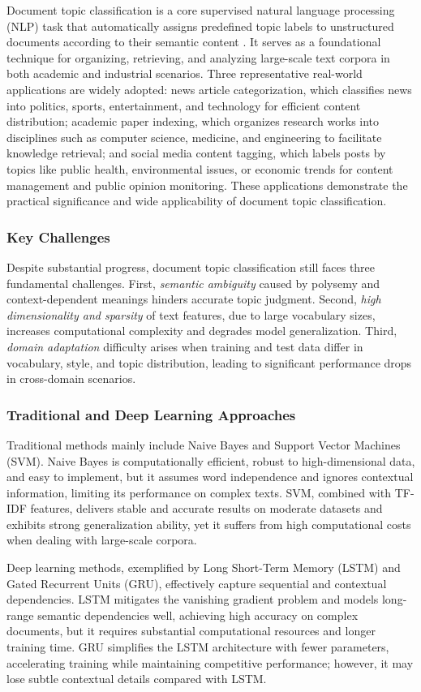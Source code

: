 Document topic classification is a core supervised natural language processing (NLP) task that automatically assigns predefined topic labels to unstructured documents according to their semantic content \cite{jurafsky2023speech}. It serves as a foundational technique for organizing, retrieving, and analyzing large-scale text corpora in both academic and industrial scenarios. Three representative real-world applications are widely adopted: news article categorization, which classifies news into politics, sports, entertainment, and technology for efficient content distribution; academic paper indexing, which organizes research works into disciplines such as computer science, medicine, and engineering to facilitate knowledge retrieval; and social media content tagging, which labels posts by topics like public health, environmental issues, or economic trends for content management and public opinion monitoring. These applications demonstrate the practical significance and wide applicability of document topic classification.

\subsubsection{Key Challenges}

Despite substantial progress, document topic classification still faces three fundamental challenges. First, \textit{semantic ambiguity} caused by polysemy and context-dependent meanings hinders accurate topic judgment. Second, \textit{high dimensionality and sparsity} of text features, due to large vocabulary sizes, increases computational complexity and degrades model generalization. Third, \textit{domain adaptation} difficulty arises when training and test data differ in vocabulary, style, and topic distribution, leading to significant performance drops in cross-domain scenarios.

\subsubsection{Traditional and Deep Learning Approaches}

Traditional methods mainly include Naive Bayes and Support Vector Machines (SVM). Naive Bayes is computationally efficient, robust to high-dimensional data, and easy to implement, but it assumes word independence and ignores contextual information, limiting its performance on complex texts. SVM, combined with TF-IDF features, delivers stable and accurate results on moderate datasets and exhibits strong generalization ability, yet it suffers from high computational costs when dealing with large-scale corpora.

Deep learning methods, exemplified by Long Short-Term Memory (LSTM) and Gated Recurrent Units (GRU), effectively capture sequential and contextual dependencies. LSTM mitigates the vanishing gradient problem and models long-range semantic dependencies well, achieving high accuracy on complex documents, but it requires substantial computational resources and longer training time. GRU simplifies the LSTM architecture with fewer parameters, accelerating training while maintaining competitive performance; however, it may lose subtle contextual details compared with LSTM.

